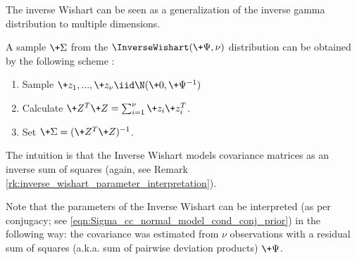 \documentclass{article} %
\begin{document}
The inverse Wishart can be seen as a generalization of the inverse gamma distribution to multiple dimensions.

A sample $\+\Sigma$ from the $\InverseWishart(\+\Psi, \nu)$ distribution can be obtained by the following scheme \cite{hoff2009first}:

\begin{enumerate}
\item Sample $\+z_1, ..., \+z_{\nu} \iid \N (\+0,  \+\Psi^{-1})$
\item Calculate $\+Z^T \+Z = \sum_{i=1}^\nu \+z_i \+z_i^T$.
\item Set $\+\Sigma = ( \+Z^T \+Z )^{-1}$.
\end{enumerate}
The intuition is that the Inverse Wishart models covariance matrices as an inverse sum of squares (again, see Remark \ref{rk:inverse_wishart_parameter_interpretation}).  


\begin{remark}{}
\label{rk:inverse_wishart_parameter_interpretation}
Note that the parameters of the Inverse Wishart can be interpreted (as per conjugacy;  see \eqref{eqn:Sigma_cc_normal_model_cond_conj_prior}) in the following way: the covariance was estimated from $\nu$ observations with a residual sum of squares (a.k.a.  sum of pairwise deviation products) $\+\Psi$. 
\end{remark}

{}

\end{document}
